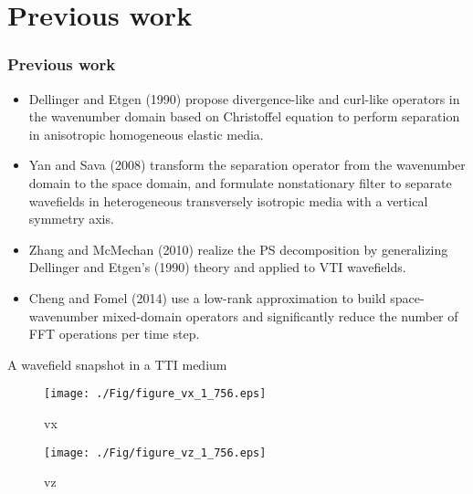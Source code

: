 \documentclass[aspectratio=169]{beamer}
\begin{document}
\section{Previous work}
\begin{frame}
  \frametitle{Previous work}
\begin{itemize}
\item{Dellinger and Etgen (1990) propose divergence-like and curl-like operators in \newline the wavenumber domain based on Christoffel equation to perform separation in \newline anisotropic homogeneous elastic media.}
\item{Yan and Sava (2008) transform the separation operator from the wavenumber \newline domain to the space domain, and formulate nonstationary filter to separate wavefields \newline in heterogeneous transversely isotropic media with a vertical symmetry axis.}
\item{Zhang and McMechan (2010) realize the PS decomposition by generalizing Dellinger \newline and Etgen's (1990) theory and applied to VTI wavefields.}
\item{Cheng and Fomel (2014) use a low-rank approximation to build space-wavenumber mixed-domain operators and significantly reduce the number of FFT operations \newline per time step.}
\end{itemize}
\end{frame}
\begin{frame}{A wavefield snapshot in a TTI medium}
   \begin{figure}[ht]
        \begin{minipage}[b]{0.45\linewidth}
            \centering
            \texttt{[image: ./Fig/figure\_vx\_1\_756.eps]}
            \caption{vx}
        \end{minipage}
        \hspace{0.5cm}
        \begin{minipage}[b]{0.45\linewidth}
            \centering
            \texttt{[image: ./Fig/figure\_vz\_1\_756.eps]}
            \caption{vz}
        \end{minipage}
    \end{figure}

\end{frame}
\end{document}
